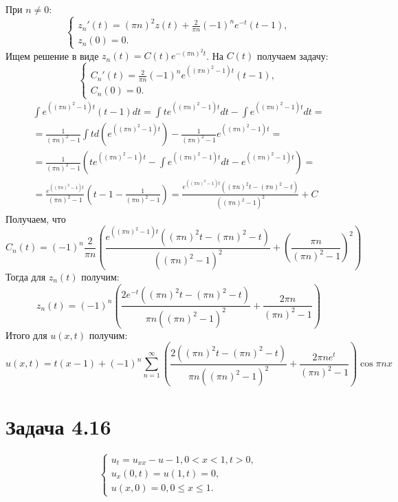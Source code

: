 \documentclass[11pt]{article}
\begin{document}
При $n \neq 0$:
\begin{equation*}
\begin{cases}
z_n'(t) = (\pi n)^2z(t) + \frac2{\pi n}(-1)^ne^{-t}(t - 1), \\
z_n(0) = 0.
\end{cases}
\end{equation*}
Ищем решение в виде $z_n(t) = C(t)e^{-(\pi n)^2t}$. На $C(t)$ получаем задачу:
\begin{equation*}
\begin{cases}
C_n'(t) = \frac2{\pi n}(-1)^ne^{((\pi n)^2 - 1)t}(t - 1), \\
C_n(0) = 0.
\end{cases}
\end{equation*}
\begin{multline*}
\int e^{((\pi n)^2 - 1)t}(t - 1)dt = \int te^{((\pi n)^2 - 1)t}dt - \int e^{((\pi n)^2 - 1)t}dt = \\
= \frac1{(\pi n)^2 - 1}\int td(e^{((\pi n)^2 - 1)t}) - \frac1{(\pi n)^2 - 1}e^{((\pi n)^2 - 1)t} = \\
= \frac1{(\pi n)^2 - 1}\left(te^{((\pi n)^2 - 1)t} - \int e^{((\pi n)^2 - 1)t}dt - e^{((\pi n)^2 - 1)t}\right) = \\
= \frac{e^{((\pi n)^2 - 1)t}}{(\pi n)^2 - 1}\left(t - 1 - \frac1{(\pi n)^2 - 1}\right)
= \frac{e^{((\pi n)^2 - 1)t}((\pi n)^2t - (\pi n)^2 - t)}{((\pi n)^2 - 1)^2} + C
\end{multline*}
Получаем, что
\begin{equation*}
C_n(t) = (-1)^n\frac2{\pi n}\left(\frac{e^{((\pi n)^2 - 1)t}((\pi n)^2t - (\pi n)^2 - t)}{((\pi n)^2 - 1)^2}
+ \left(\frac{\pi n}{(\pi n)^2 - 1}\right)^2\right)
\end{equation*}
Тогда для $z_n(t)$ получим:
\begin{equation*}
z_n(t) = (-1)^n\left(\frac{2e^{-t}((\pi n)^2t - (\pi n)^2 - t)}{\pi n((\pi n)^2 - 1)^2} +
\frac{2\pi n}{(\pi n)^2 - 1}\right)
\end{equation*}
Итого для $u(x, t)$ получим:
\begin{equation}
u(x, t) = t(x - 1) + (-1)^n\sum_{n = 1}^{\infty}\left(\frac{2((\pi n)^2t - (\pi n)^2 - t)}{\pi n((\pi n)^2 - 1)^2} + \frac{2\pi ne^t}{(\pi n)^2 - 1}\right)\cos \pi nx
\end{equation}
\section{Задача 4.16}
\label{sec:org04aa00c}
\begin{equation}
\begin{cases}
u_t = u_{xx} - u - 1, 0 < x < 1, t > 0, \\
u_x(0, t) = u(1, t) = 0, \\
u(x, 0) = 0, 0 \leq x \leq 1.
\end{cases}
\end{equation}
\end{document}
